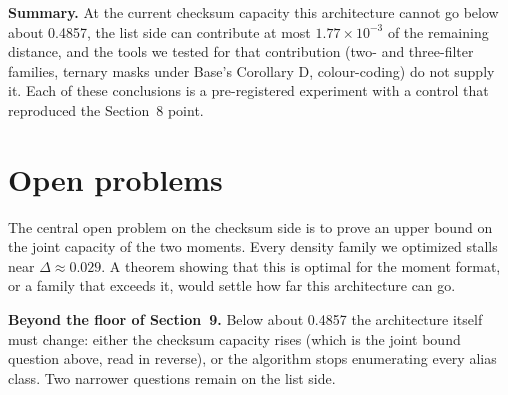 \documentclass[11pt]{article}
\theoremstyle{plain}
\begin{document}
\textbf{Summary.} At the current checksum capacity this architecture cannot go below about 0.4857, the list side can contribute at most $1.77\times10^{-3}$ of the remaining distance, and the tools we tested for that contribution (two- and three-filter families, ternary masks under Base's Corollary D, colour-coding) do not supply it. Each of these conclusions is a pre-registered experiment with a control that reproduced the Section~8 point.

\section{Open problems}

The central open problem on the checksum side is to prove an upper bound on the joint capacity of the two moments. Every density family we optimized stalls near $\Delta \approx 0.029$. A theorem showing that this is optimal for the moment format, or a family that exceeds it, would settle how far this architecture can go.

\textbf{Beyond the floor of Section~9.} Below about 0.4857 the architecture itself must change: either the checksum capacity rises (which is the joint bound question above, read in reverse), or the algorithm stops enumerating every alias class. Two narrower questions remain on the list side.
\end{document}
